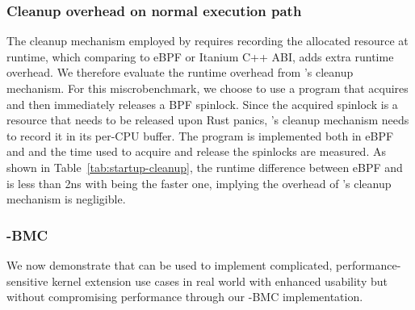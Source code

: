 \subsubsection{Cleanup overhead on normal execution path}
The cleanup mechanism employed by \projname{} requires recording the allocated
    resource at runtime, which comparing to eBPF or Itanium C++ ABI, adds extra
    runtime overhead.
We therefore evaluate the runtime overhead from \projname{}'s cleanup
    mechanism.
For this miscrobenchmark, we choose to use a program that acquires and then
    immediately releases a BPF spinlock.
Since the acquired spinlock is a resource that needs to be released upon Rust
    panics, \projname{}'s cleanup mechanism needs to record it in its per-CPU
    buffer.
The program is implemented both in eBPF and \projname{} and the time used to
    acquire and release the spinlocks are measured.
As shown in Table~\ref{tab:startup-cleanup}, the runtime difference between
    eBPF and \projname{} is less than 2ns with \projname{} being the faster
    one, implying the overhead of \projname{}'s cleanup mechanism is
    negligible.

\subsubsection{\projname{}-BMC}
\label{eval:macro}
We now demonstrate that \projname{} can be used to implement complicated,
    performance-sensitive kernel extension use cases in real world with enhanced
    usability but without
    compromising performance through our \projname{}-BMC implementation.

%

